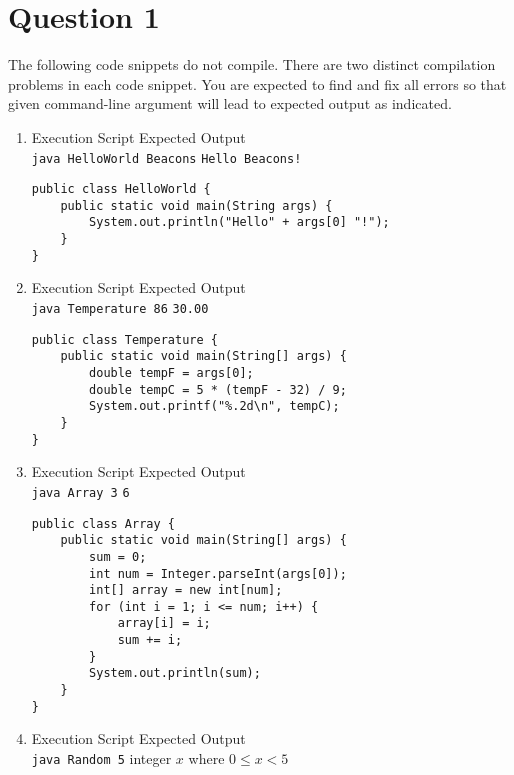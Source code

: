 \documentclass[12pt,letterpaper,twoside]{article}
\begin{document}


\section*{Question 1}

The following code snippets do not compile.
There are two distinct compilation problems in each code snippet.
You are expected to find and fix all errors so that given command-line argument will lead to expected output as indicated.

\begin{enumerate}[label=\textbf{(\alph*)}]

\item Execution Script \hfill Expected Output\\
\texttt{java HelloWorld Beacons} \hfill \texttt{Hello Beacons!}

\begin{lstlisting}
public class HelloWorld {
	public static void main(String args) {
		System.out.println("Hello" + args[0] "!");
	}
}
\end{lstlisting}

\item Execution Script \hfill Expected Output\\
\texttt{java Temperature 86} \hfill \texttt{30.00}

\begin{lstlisting}
public class Temperature {
	public static void main(String[] args) {
		double tempF = args[0];
		double tempC = 5 * (tempF - 32) / 9;
		System.out.printf("%.2d\n", tempC);
	}
}
\end{lstlisting}

\newpage

\item Execution Script \hfill Expected Output\\
\texttt{java Array 3} \hfill \texttt{6}

\begin{lstlisting}
public class Array {
	public static void main(String[] args) {
		sum = 0;
		int num = Integer.parseInt(args[0]);
		int[] array = new int[num];
		for (int i = 1; i <= num; i++) {
			array[i] = i;
			sum += i;
		}
		System.out.println(sum);
	}
}
\end{lstlisting}

\item Execution Script \hfill Expected Output\\
\texttt{java Random 5} \hfill integer $x$ where $0 \leq x < 5$


\end{enumerate}
\end{document}
